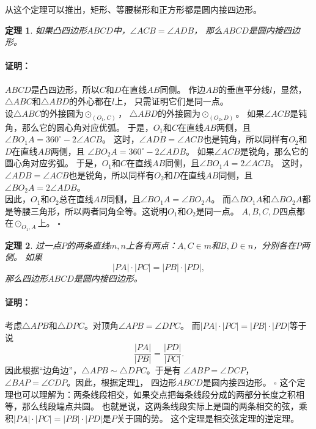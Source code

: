 \documentclass[12pt,UTF8]{ctexbook}
\newtheorem{tm}{定理}[section]
\renewenvironment{proof}{\paragraph{\textbf{证明：}}}{\hfill$\square$}
\begin{document}
从这个定理可以推出，矩形、等腰梯形和正方形都是圆内接四边形。

\begin{tm}\label{tm:1-1-10}
    如果凸四边形$ABCD$中，$\angle ACB = \angle ADB$，
    那么$ABCD$是圆内接四边形。
\end{tm}

\begin{proof}
    $ABCD$是凸四边形，所以$C$和$D$在直线$AB$同侧。
    作边$AB$的垂直平分线$l$，显然，$\triangle ABC$和$\triangle ABD$的外心都在$l$上，
    只需证明它们是同一点。\\
    设$\triangle ABC$的外接圆为$\odot_{(O_1, C)}$，
    $\triangle ABD$的外接圆为$\odot_{(O_2, D)}$。
    如果$\angle ACB$是钝角，那么它的圆心角对应优弧。
    于是，$O_1$和$C$在直线$AB$两侧，且$\angle BO_1A = 360^\circ - 2\angle ACB$。
    这时，$\angle ADB = \angle ACB$也是钝角，所以同样有$O_2$和$D$在直线$AB$两侧，且
    $\angle BO_2A = 360^\circ - 2\angle ADB$。
    如果$\angle ACB$是锐角，那么它的圆心角对应劣弧。
    于是，$O_1$和$C$在直线$AB$同侧，且$\angle BO_1A = 2\angle ACB$。
    这时，$\angle ADB = \angle ACB$也是锐角，所以同样有$O_2$和$D$在直线$AB$同侧，且
    $\angle BO_2A = 2\angle ADB$。\\
    因此，$O_1$和$O_2$总在直线$AB$同侧，且$\angle BO_1A = \angle BO_2A$。
    而$\triangle BO_1A$和$\triangle BO_2A$都是等腰三角形，所以两者同角全等。这说明$O_1$和$O_2$是同一点。
    $A,B,C,D$四点都在$\odot_{O_1, A}$上。
\end{proof}

\begin{tm}\label{tm:1-1-20}
    过一点$P$的两条直线$m,n$上各有两点：$A, C\in m$和$B, D \in n$，分别各在$P$两侧。
    如果
    $$ |PA| \cdot |PC| = |PB| \cdot |PD|, $$
    那么四边形$ABCD$是圆内接四边形。
\end{tm}

\begin{proof}
    考虑$\triangle APB$和$\triangle DPC$。对顶角$\angle APB = \angle DPC$。
    而$ |PA| \cdot |PC| = |PB| \cdot |PD|$等于说
    $$ \frac{|PA|}{|PB|} = \frac{|PD|}{|PC|}.$$
    因此根据“边角边”，$\triangle APB \sim \triangle DPC$。于是有
    $\angle ABP = \angle DCP$，$\angle BAP = \angle CDP$。因此，根据定理\ref{tm:1-1-10}，
    四边形$ABCD$是圆内接四边形。
\end{proof}
这个定理也可以理解为：两条线段相交，如果交点把每条线段分成的两部分长度之积相等，那么线段端点共圆。
也就是说，这两条线段实际上是圆的两条相交的弦，乘积$ |PA| \cdot |PC| = |PB| \cdot |PD|$是$P$关于圆的势。
这个定理是相交弦定理的逆定理。
\end{document}
